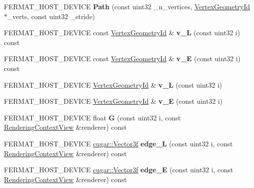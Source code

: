 \begin{DoxyCompactItemize}
\item 
\mbox{\label{struct_path_aa30b5405c1ddf9026a8a4a878caedf14}} 
F\+E\+R\+M\+A\+T\+\_\+\+H\+O\+S\+T\+\_\+\+D\+E\+V\+I\+CE {\bfseries Path} (const uint32 \+\_\+n\+\_\+vertices, \hyperlink{struct_vertex_geometry_id}{Vertex\+Geometry\+Id} $\ast$\+\_\+verts, const uint32 \+\_\+stride)
\item 
\mbox{\label{struct_path_af5f50f1500ffcf2be814ef5c62be407f}} 
F\+E\+R\+M\+A\+T\+\_\+\+H\+O\+S\+T\+\_\+\+D\+E\+V\+I\+CE const \hyperlink{struct_vertex_geometry_id}{Vertex\+Geometry\+Id} \& {\bfseries v\+\_\+L} (const uint32 i) const
\item 
\mbox{\label{struct_path_a13616464c91185262c8cb8ae296688a2}} 
F\+E\+R\+M\+A\+T\+\_\+\+H\+O\+S\+T\+\_\+\+D\+E\+V\+I\+CE const \hyperlink{struct_vertex_geometry_id}{Vertex\+Geometry\+Id} \& {\bfseries v\+\_\+E} (const uint32 i) const
\item 
\mbox{\label{struct_path_ad3bd90bb4c64dbab4843014f2b614136}} 
F\+E\+R\+M\+A\+T\+\_\+\+H\+O\+S\+T\+\_\+\+D\+E\+V\+I\+CE \hyperlink{struct_vertex_geometry_id}{Vertex\+Geometry\+Id} \& {\bfseries v\+\_\+L} (const uint32 i)
\item 
\mbox{\label{struct_path_a38a66c133d4ed740fc5b2416599a6788}} 
F\+E\+R\+M\+A\+T\+\_\+\+H\+O\+S\+T\+\_\+\+D\+E\+V\+I\+CE \hyperlink{struct_vertex_geometry_id}{Vertex\+Geometry\+Id} \& {\bfseries v\+\_\+E} (const uint32 i)
\item 
\mbox{\label{struct_path_afbc51ed7086e523c8ae0d5a62d6ccb3d}} 
F\+E\+R\+M\+A\+T\+\_\+\+H\+O\+S\+T\+\_\+\+D\+E\+V\+I\+CE float {\bfseries G} (const uint32 i, const \hyperlink{struct_rendering_context_view}{Rendering\+Context\+View} \&renderer) const
\item 
\mbox{\label{struct_path_a278e02a02b9c176eb81688db7828a8cf}} 
F\+E\+R\+M\+A\+T\+\_\+\+H\+O\+S\+T\+\_\+\+D\+E\+V\+I\+CE \hyperlink{structcugar_1_1_vector}{cugar\+::\+Vector3f} {\bfseries edge\+\_\+L} (const uint32 i, const \hyperlink{struct_rendering_context_view}{Rendering\+Context\+View} \&renderer) const
\item 
\mbox{\label{struct_path_a4614790d32103332f90f0c3a135a2933}} 
F\+E\+R\+M\+A\+T\+\_\+\+H\+O\+S\+T\+\_\+\+D\+E\+V\+I\+CE \hyperlink{structcugar_1_1_vector}{cugar\+::\+Vector3f} {\bfseries edge\+\_\+E} (const uint32 i, const \hyperlink{struct_rendering_context_view}{Rendering\+Context\+View} \&renderer) const
\end{DoxyCompactItemize}
